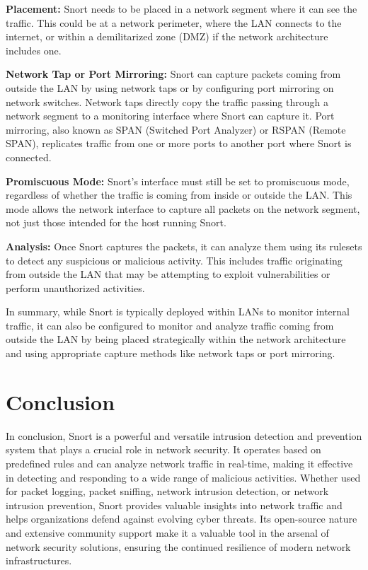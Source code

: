 \documentclass{article}
\begin{document}
\textbf{Placement:} Snort needs to be placed in a network segment where it can see the traffic. This could be at a network perimeter, where the LAN connects to the internet, or within a demilitarized zone (DMZ) if the network architecture includes one.

\textbf{Network Tap or Port Mirroring:} Snort can capture packets coming from outside the LAN by using network taps or by configuring port mirroring on network switches. Network taps directly copy the traffic passing through a network segment to a monitoring interface where Snort can capture it. Port mirroring, also known as SPAN (Switched Port Analyzer) or RSPAN (Remote SPAN), replicates traffic from one or more ports to another port where Snort is connected.

\textbf{Promiscuous Mode:} Snort's interface must still be set to promiscuous mode, regardless of whether the traffic is coming from inside or outside the LAN. This mode allows the network interface to capture all packets on the network segment, not just those intended for the host running Snort.

\textbf{Analysis:} Once Snort captures the packets, it can analyze them using its rulesets to detect any suspicious or malicious activity. This includes traffic originating from outside the LAN that may be attempting to exploit vulnerabilities or perform unauthorized activities.

In summary, while Snort is typically deployed within LANs to monitor internal traffic, it can also be configured to monitor and analyze traffic coming from outside the LAN by being placed strategically within the network architecture and using appropriate capture methods like network taps or port mirroring.
\clearpage
\section{Conclusion}
\label{sec:Conslusion}
 In conclusion, Snort is a powerful and versatile intrusion detection and prevention system that plays a crucial role in network security. It operates based on predefined rules and can analyze network traffic in real-time, making it effective in detecting and responding to a wide range of malicious activities. Whether used for packet logging, packet sniffing, network intrusion detection, or network intrusion prevention, Snort provides valuable insights into network traffic and helps organizations defend against evolving cyber threats. Its open-source nature and extensive community support make it a valuable tool in the arsenal of network security solutions, ensuring the continued resilience of modern network infrastructures.
\end{document}
